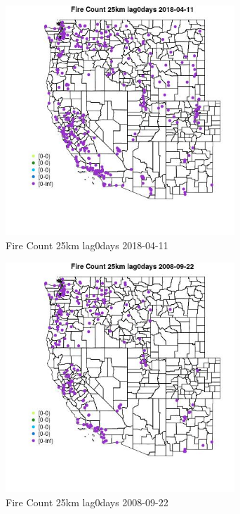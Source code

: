 \begin{figure} 
\centering  
\includegraphics[width=0.77\textwidth]{Code_Outputs/Report_ML_input_PM25_Step4_part_e_de_duplicated_aves_compiled_2019-05-18wNAs_MapObsFire_Count_25km_lag0days2018-04-11.jpg} 
\caption{\label{fig:Report_ML_input_PM25_Step4_part_e_de_duplicated_aves_compiled_2019-05-18wNAsMapObsFire_Count_25km_lag0days2018-04-11}Fire Count 25km lag0days 2018-04-11} 
\end{figure} 
 

\begin{figure} 
\centering  
\includegraphics[width=0.77\textwidth]{Code_Outputs/Report_ML_input_PM25_Step4_part_e_de_duplicated_aves_compiled_2019-05-18wNAs_MapObsFire_Count_25km_lag0days2008-09-22.jpg} 
\caption{\label{fig:Report_ML_input_PM25_Step4_part_e_de_duplicated_aves_compiled_2019-05-18wNAsMapObsFire_Count_25km_lag0days2008-09-22}Fire Count 25km lag0days 2008-09-22} 
\end{figure} 
 

